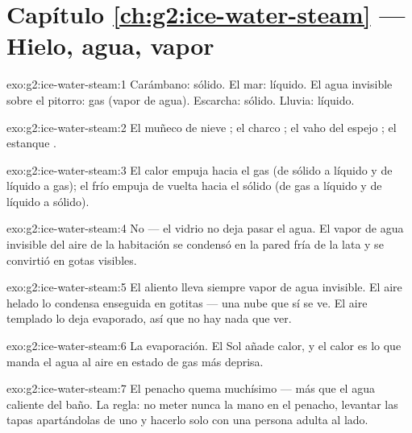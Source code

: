 \section*{Capítulo \ref{ch:g2:ice-water-steam} --- Hielo, agua, vapor}

\begin{solution}{exo:g2:ice-water-steam:1}
Carámbano: sólido. El mar: líquido. El agua invisible sobre el
pitorro: gas (vapor de agua). Escarcha: sólido. Lluvia: líquido.
\end{solution}

\begin{solution}{exo:g2:ice-water-steam:2}
El muñeco de nieve ; el charco ; el vaho del
espejo ; el estanque .
\end{solution}

\begin{solution}{exo:g2:ice-water-steam:3}
El calor empuja hacia el gas (de sólido a líquido y de líquido a gas);
el frío empuja de vuelta hacia el sólido (de gas a líquido y de
líquido a sólido).
\end{solution}

\begin{solution}{exo:g2:ice-water-steam:4}
No --- el vidrio no deja pasar el agua. El vapor de agua invisible del
aire de la habitación se condensó en la pared fría de la lata y se
convirtió en gotas visibles.
\end{solution}

\begin{solution}{exo:g2:ice-water-steam:5}
El aliento lleva siempre vapor de agua invisible. El aire helado lo
condensa enseguida en gotitas --- una nube que sí se ve. El aire
templado lo deja evaporado, así que no hay nada que ver.
\end{solution}

\begin{solution}{exo:g2:ice-water-steam:6}
La evaporación. El Sol añade calor, y el calor es lo que manda el agua
al aire en estado de gas más deprisa.
\end{solution}

\begin{solution}{exo:g2:ice-water-steam:7}
El penacho quema muchísimo --- más que el agua caliente del baño. La
regla: no meter nunca la mano en el penacho, levantar las tapas
apartándolas de uno y hacerlo solo con una persona adulta al lado.
\end{solution}


